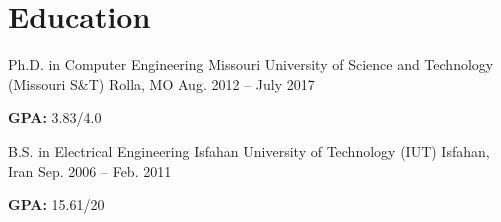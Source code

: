 \section{Education}
\begin{cventries}
  \cventry
    {Ph.D. in Computer Engineering}
    {Missouri University of Science and Technology (Missouri S\&T)}
    {Rolla, MO}
    {Aug. 2012 -- July 2017}
    {
      \begin{cvitems}
        \item \textbf{GPA:} 3.83/4.0
      \end{cvitems}
    }
  \cventry
    {B.S. in Electrical Engineering}
    {Isfahan University of Technology (IUT)}
    {Isfahan, Iran}
    {Sep. 2006 -- Feb. 2011}
    {
      \begin{cvitems}
        \item \textbf{GPA:} 15.61/20
      \end{cvitems}
    }
\end{cventries} 